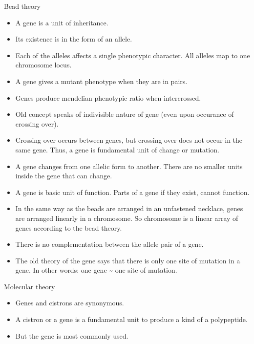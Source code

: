\documentclass[11pt,dvipsnames,ignorenonframetext,aspectratio=169]{beamer}
\providecommand{\tightlist}{%
  \setlength{\itemsep}{0pt}\setlength{\parskip}{0pt}}
\begin{document}
\begin{frame}{Bead theory}
\protect\hypertarget{bead-theory}{}
\begin{itemize}
\tightlist
\item
  A gene is a unit of inheritance.
\item
  Its existence is in the form of an allele.
\item
  Each of the alleles affects a single phenotypic character. All alleles
  map to one chromosome locus.
\item
  A gene gives a mutant phenotype when they are in pairs.
\item
  Genes produce mendelian phenotypic ratio when intercrossed.
\item
  Old concept speaks of indivisible nature of gene (even upon occurance
  of crossing over).
\item
  Crossing over occurs between genes, but crossing over does not occur
  in the same gene. Thus, a gene is fundamental unit of change or
  mutation.
\end{itemize}
\end{frame}

\begin{frame}{}
\protect\hypertarget{section-24}{}
\begin{itemize}
\tightlist
\item
  A gene changes from one allelic form to another. There are no smaller
  units inside the gene that can change.
\item
  A gene is basic unit of function. Parts of a gene if they exist,
  cannot function.
\item
  In the same way as the beads are arranged in an unfastened necklace,
  genes are arranged linearly in a chromosome. So chromosome is a linear
  array of genes according to the bead theory.
\item
  There is no complementation between the allele pair of a gene.
\item
  The old theory of the gene says that there is only one site of
  mutation in a gene. In other words: one gene \textasciitilde{} one
  site of mutation.
\end{itemize}
\end{frame}

\begin{frame}{Molecular theory}
\protect\hypertarget{molecular-theory}{}
\begin{itemize}
\tightlist
\item
  Genes and cistrons are synonymous.
\item
  A cistron or a gene is a fundamental unit to produce a kind of a
  polypeptide.
\item
  But the gene is most commonly used.
\end{itemize}
\end{frame}
\end{document}
